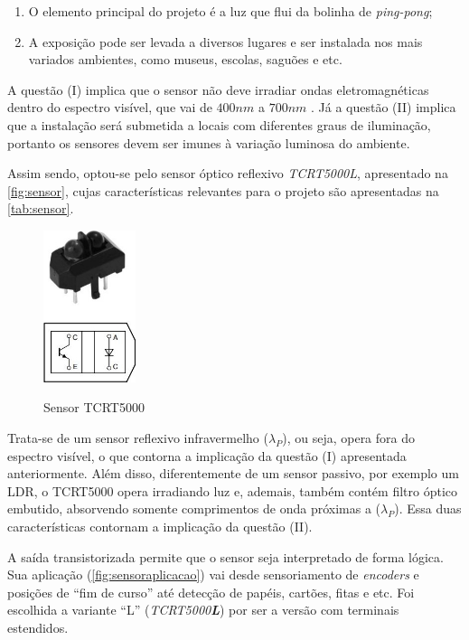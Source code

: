 \begin{enumerate}[label=\Roman*.]
    \item O elemento principal do projeto é a luz que flui da bolinha de \emph{ping-pong};
    \item A exposição pode ser levada a diversos lugares e ser instalada nos mais variados ambientes, como museus, escolas, saguões e etc.
\end{enumerate}

A questão (I) implica que o sensor não deve irradiar ondas eletromagnéticas dentro do espectro visível, que vai de $400nm$ a $700nm$ \cite{fundafisica}. Já a questão (II) implica que a instalação será submetida a locais com diferentes graus de iluminação, portanto os sensores devem ser imunes à variação luminosa do ambiente.

Assim sendo, optou-se pelo sensor óptico reflexivo \emph{TCRT5000L}, apresentado na \autoref{fig:sensor}, cujas características relevantes para o projeto são apresentadas na \autoref{tab:sensor}.

\begin{figure}[H]
    \centering
    \caption{Sensor TCRT5000}
    \includegraphics[width=0.24\textwidth]{./dados/figuras/sensor}
    \label{fig:sensor}
\end{figure}



Trata-se de um sensor reflexivo infravermelho ($\lambda_{P}$), ou seja, opera fora do espectro visível, o que contorna a implicação da questão (I) apresentada anteriormente. Além disso, diferentemente de um sensor passivo, por exemplo um LDR, o TCRT5000 opera irradiando luz e, ademais, também contém filtro óptico embutido, absorvendo somente comprimentos de onda próximas a ($\lambda_{P}$). Essa duas características contornam a implicação da questão (II).

A saída transistorizada permite que o sensor seja interpretado de forma lógica. Sua aplicação (\autoref{fig:sensoraplicacao}) vai desde sensoriamento de \emph{encoders} e posições de ``fim de curso'' até detecção de papéis, cartões, fitas e etc. Foi escolhida a variante ``L'' (\emph{TCRT5000\textbf{L}}) por ser a versão com terminais estendidos.

